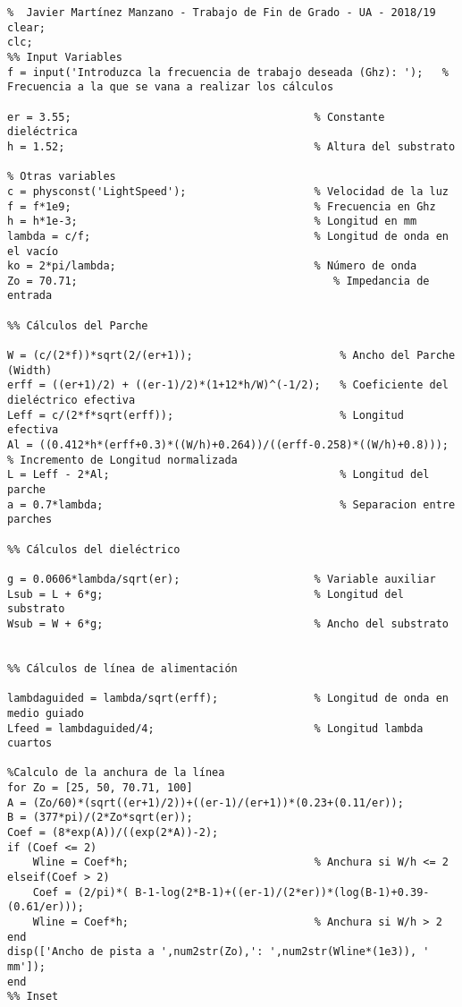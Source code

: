 \begin{lstlisting}[style=Matlab-color, caption={\textit{AntennaPatchCalculator.m}},label=codigofull]
%% CALCULADOR DE PARAMETROS Y DIMENSIONES DE ANTENAS DE PARCHE MICROSTRIP
%  Javier Martínez Manzano - Trabajo de Fin de Grado - UA - 2018/19
clear;
clc;
%% Input Variables
f = input('Introduzca la frecuencia de trabajo deseada (Ghz): ');   % Frecuencia a la que se vana a realizar los cálculos

er = 3.55;                                      % Constante dieléctrica
h = 1.52;                                       % Altura del substrato

% Otras variables
c = physconst('LightSpeed');                    % Velocidad de la luz
f = f*1e9;                                      % Frecuencia en Ghz
h = h*1e-3;                                     % Longitud en mm
lambda = c/f;                                   % Longitud de onda en el vacío
ko = 2*pi/lambda;                               % Número de onda
Zo = 70.71;                                        % Impedancia de entrada

%% Cálculos del Parche

W = (c/(2*f))*sqrt(2/(er+1));                       % Ancho del Parche (Width)
erff = ((er+1)/2) + ((er-1)/2)*(1+12*h/W)^(-1/2);   % Coeficiente del dieléctrico efectiva
Leff = c/(2*f*sqrt(erff));                          % Longitud efectiva
Al = ((0.412*h*(erff+0.3)*((W/h)+0.264))/((erff-0.258)*((W/h)+0.8))); % Incremento de Longitud normalizada
L = Leff - 2*Al;                                    % Longitud del parche
a = 0.7*lambda;                                     % Separacion entre parches

%% Cálculos del dieléctrico

g = 0.0606*lambda/sqrt(er);                     % Variable auxiliar
Lsub = L + 6*g;                                 % Longitud del substrato
Wsub = W + 6*g;                                 % Ancho del substrato


%% Cálculos de línea de alimentación

lambdaguided = lambda/sqrt(erff);               % Longitud de onda en medio guiado
Lfeed = lambdaguided/4;                         % Longitud lambda cuartos

%Calculo de la anchura de la línea
for Zo = [25, 50, 70.71, 100]
A = (Zo/60)*(sqrt((er+1)/2))+((er-1)/(er+1))*(0.23+(0.11/er)); 
B = (377*pi)/(2*Zo*sqrt(er));
Coef = (8*exp(A))/((exp(2*A))-2);
if (Coef <= 2)
    Wline = Coef*h;                             % Anchura si W/h <= 2
elseif(Coef > 2)
    Coef = (2/pi)*( B-1-log(2*B-1)+((er-1)/(2*er))*(log(B-1)+0.39-(0.61/er)));
    Wline = Coef*h;                             % Anchura si W/h > 2
end
disp(['Ancho de pista a ',num2str(Zo),': ',num2str(Wline*(1e3)), ' mm']);
end
%% Inset


\end{lstlisting}
